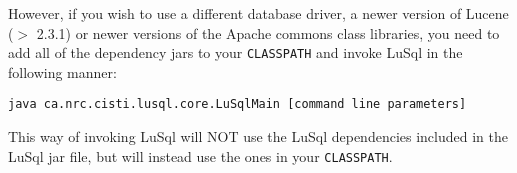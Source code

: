 However, if you wish to use a different database driver, a newer version of
Lucene ($>$ 2.3.1) or newer versions of the Apache commons class libraries, you
need to add all of the dependency jars to your {\tt CLASSPATH} and invoke
LuSql in the following manner: 
{\small
\begin{lstlisting}[backgroundcolor=\color{grey}]
  java ca.nrc.cisti.lusql.core.LuSqlMain [command line parameters]
\end{lstlisting}
}

This way of invoking LuSql will NOT use the LuSql dependencies included in the
LuSql jar file, but will instead use the ones in your {\tt CLASSPATH}.
